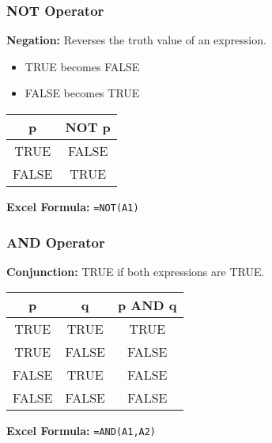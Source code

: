 \documentclass{beamer}
\begin{document}
\begin{frame}
\frametitle{NOT Operator}
\textbf{Negation:} Reverses the truth value of an expression.\pause

\begin{itemize}
    \item TRUE becomes FALSE\pause
    \item FALSE becomes TRUE
\end{itemize}\pause

\vspace{0.3cm}
\begin{center}
\begin{tabular}{|c|c|}
\hline
\textbf{p} & \textbf{NOT p} \\
\hline
TRUE & FALSE \\
\hline
FALSE & TRUE \\
\hline
\end{tabular}
\end{center}\pause

\vspace{0.3cm}
\textbf{Excel Formula:} \texttt{=NOT(A1)}
\end{frame}

\begin{frame}
\frametitle{AND Operator}
\textbf{Conjunction:} TRUE if \alert{both} expressions are TRUE.\pause

\vspace{0.3cm}
\begin{center}
\begin{tabular}{|c|c|c|}
\hline
\textbf{p} & \textbf{q} & \textbf{p AND q} \\
\hline
TRUE & TRUE & TRUE \\
\hline
TRUE & FALSE & FALSE \\
\hline
FALSE & TRUE & FALSE \\
\hline
FALSE & FALSE & FALSE \\
\hline
\end{tabular}
\end{center}\pause

\vspace{0.3cm}
\textbf{Excel Formula:} \texttt{=AND(A1,A2)}
\end{frame}
\end{document}
